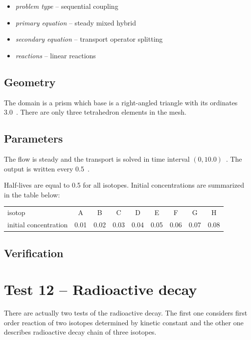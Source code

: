 \begin{itemize} 
    \item \emph{problem type} -- sequential coupling
    \item \emph{primary equation} -- steady mixed hybrid
    \item \emph{secondary equation} -- transport operator splitting
    \item \emph{reactions} -- linear reactions
  \end{itemize}

\subsection*{Geometry}
The domain is a prism which base is a right-angled triangle with its ordinates 3.0~. 
There are only three tetrahedron elements in the mesh.

\subsection*{Parameters}
The flow is steady and the transport is solved in time interval $(0,10.0)$~. The output is written every 0.5~.

Half-lives are equal to 0.5 for all isotopes. Initial concentrations are summarized in the table below:
  \begin{center}
    \begin{tabular}[c]{|l|c|c|c|c|c|c|c|c|}
      \hline
      isotop & A & B  & C & D & E & F & G & H \\[4pt]
      initial concentration & 0.01 & 0.02 & 0.03 & 0.04 & 0.05 & 0.06 & 0.07 & 0.08 \\[4pt]
      \hline
    \end{tabular}
  \end{center}


\subsection*{Verification}



\section{Test 12 -- Radioactive decay}
There are actually two tests of the radioactive decay. The first one considers first order reaction of two isotopes 
determined by kinetic constant and the other one describes radioactive decay chain of three isotopes.

